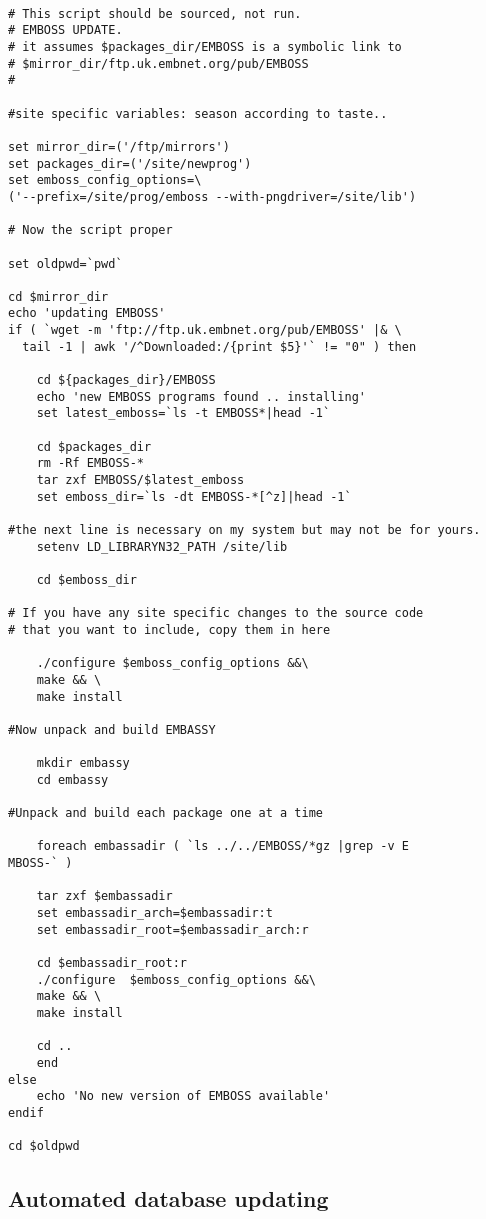 \documentclass{report}
\begin{document}
\begin{verbatim}

# This script should be sourced, not run.
# EMBOSS UPDATE.
# it assumes $packages_dir/EMBOSS is a symbolic link to 
# $mirror_dir/ftp.uk.embnet.org/pub/EMBOSS
#

#site specific variables: season according to taste..

set mirror_dir=('/ftp/mirrors')
set packages_dir=('/site/newprog')
set emboss_config_options=\
('--prefix=/site/prog/emboss --with-pngdriver=/site/lib')

# Now the script proper

set oldpwd=`pwd`

cd $mirror_dir
echo 'updating EMBOSS'
if ( `wget -m 'ftp://ftp.uk.embnet.org/pub/EMBOSS' |& \
  tail -1 | awk '/^Downloaded:/{print $5}'` != "0" ) then 

    cd ${packages_dir}/EMBOSS
    echo 'new EMBOSS programs found .. installing'
    set latest_emboss=`ls -t EMBOSS*|head -1`

    cd $packages_dir
    rm -Rf EMBOSS-*
    tar zxf EMBOSS/$latest_emboss
    set emboss_dir=`ls -dt EMBOSS-*[^z]|head -1`

#the next line is necessary on my system but may not be for yours.
    setenv LD_LIBRARYN32_PATH /site/lib

    cd $emboss_dir

# If you have any site specific changes to the source code 
# that you want to include, copy them in here

    ./configure $emboss_config_options &&\
    make && \
    make install

#Now unpack and build EMBASSY

    mkdir embassy
    cd embassy

#Unpack and build each package one at a time

    foreach embassadir ( `ls ../../EMBOSS/*gz |grep -v E
MBOSS-` )

	tar zxf $embassadir
	set embassadir_arch=$embassadir:t
	set embassadir_root=$embassadir_arch:r

	cd $embassadir_root:r
	./configure  $emboss_config_options &&\
	make && \
	make install

	cd ..
    end
else
    echo 'No new version of EMBOSS available'
endif

cd $oldpwd
\end{verbatim} 

\subsection{Automated database updating}
\end{document}
